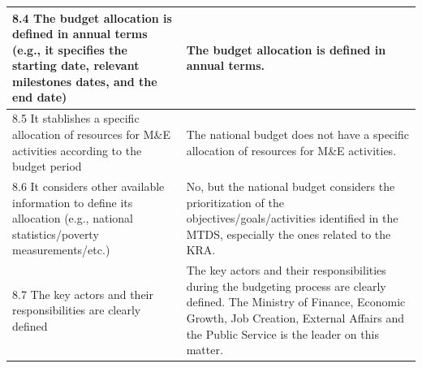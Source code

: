 \documentclass[
  10pt,
]{book}
\begin{document}
\begin{table}
\begin{tabular}[t]{l|l}
\hline
\hspace{1em}8.4 The budget allocation is defined in annual terms (e.g., it specifies the starting date, relevant milestones dates, and the end date) & The budget allocation is defined in annual terms.\\
\hline
\hspace{1em}8.5 It stablishes a specific allocation of resources for M\&E activities according to the budget period & The national budget does not have a specific allocation of resources for M\&E activities.\\
\hline
\hspace{1em}8.6 It considers other available information to define its allocation (e.g., national statistics/poverty measurements/etc.) & No, but the national budget considers the prioritization of the objectives/goals/activities identified in the MTDS, especially the ones related to the KRA.\\
\hline
\hspace{1em}8.7 The key actors and their responsibilities are clearly defined & The key actors and their responsibilities during the budgeting process are clearly defined. The Ministry of Finance, Economic Growth, Job Creation, External Affairs and the Public Service is the leader on this matter.\\
\hline
\end{tabular}
\end{table}
\end{document}
